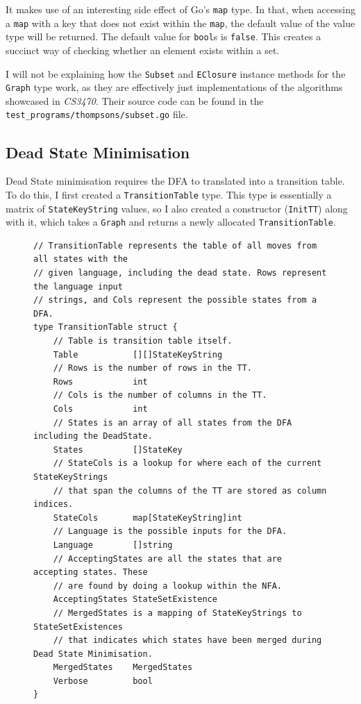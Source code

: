 \documentclass[]{full}
\theoremstyle{definition}
\begin{document}
It makes use of an interesting side effect of Go's \verb|map| type. In that, when accessing a \verb|map| with a key that does not exist within the \verb|map|, the default value of the value type will be returned. The default value for \verb|bool|s is \verb|false|. This creates a succinct way of checking whether an element exists within a set.

I will not be explaining how the \verb|Subset| and \verb|EClosure| instance methods for the \verb|Graph| type work, as they are effectively just implementations of the algorithms showcased in \textit{CS3470}. Their source code can be found in the \verb|test_programs/thompsons/subset.go| file.

\subsection{Dead State Minimisation}

Dead State minimisation requires the DFA to translated into a transition table. To do this, I first created a \verb|TransitionTable| type. This type is essentially a matrix of \verb|StateKeyString| values, so I also created a constructor (\verb|InitTT|) along with it, which takes a \verb|Graph| and returns a newly allocated \verb|TransitionTable|.

\begin{figure}[H]    
    \begin{verbatim}
// TransitionTable represents the table of all moves from all states with the
// given language, including the dead state. Rows represent the language input
// strings, and Cols represent the possible states from a DFA.
type TransitionTable struct {
    // Table is transition table itself.
    Table           [][]StateKeyString
    // Rows is the number of rows in the TT.
    Rows            int
    // Cols is the number of columns in the TT.
    Cols            int
    // States is an array of all states from the DFA including the DeadState.
    States          []StateKey
    // StateCols is a lookup for where each of the current StateKeyStrings 
    // that span the columns of the TT are stored as column indices.
    StateCols       map[StateKeyString]int
    // Language is the possible inputs for the DFA.
    Language        []string
    // AcceptingStates are all the states that are accepting states. These 
    // are found by doing a lookup within the NFA.
    AcceptingStates StateSetExistence
    // MergedStates is a mapping of StateKeyStrings to StateSetExistences 
    // that indicates which states have been merged during Dead State Minimisation.
    MergedStates    MergedStates
    Verbose         bool
}
    \end{verbatim}
\end{figure}
\end{document}
